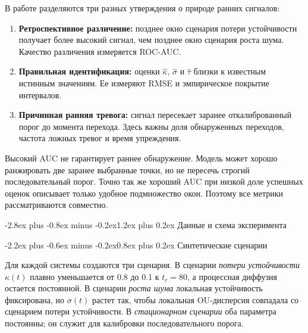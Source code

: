 \documentclass[12pt,a4paper]{article}
\makeatletter
\numberwithin{table}{section}
\numberwithin{figure}{section}
\renewcommand\section{\@startsection{section}{1}{0pt}
  {-2.8ex plus -0.8ex minus -0.2ex}{1.2ex plus 0.2ex}
  {\centering\normalfont\normalsize\bfseries}}
\renewcommand\subsection{\@startsection{subsection}{2}{0pt}
  {-2.2ex plus -0.6ex minus -0.2ex}{0.8ex plus 0.2ex}
  {\normalfont\normalsize\bfseries}}
\newcommand{\term}[1]{\textit{#1}}
\makeatother
\begin{document}
В работе разделяются три разных утверждения о природе ранних сигналов:

\begin{enumerate}
\item \textbf{Ретроспективное различение:} позднее окно сценария потери
устойчивости получает более высокий сигнал, чем позднее окно сценария роста
шума. Качество различения измеряется ROC-AUC.
\item \textbf{Правильная идентификация:} оценки $\widehat\kappa$,
$\widehat\sigma$ и $\widehat\tau$ близки к известным истинным значениям. Ее
измеряют RMSE и эмпирическое покрытие интервалов.
\item \textbf{Причинная ранняя тревога:} сигнал пересекает заранее
откалиброванный порог до момента перехода. Здесь важны доля обнаруженных
переходов, частота ложных тревог и время упреждения.
\end{enumerate}

Высокий AUC не гарантирует раннее обнаружение. Модель может хорошо ранжировать
две заранее выбранные точки, но не пересечь строгий последовательный порог.
Точно так же хороший AUC при низкой доле успешных оценок описывает только
удобное подмножество окон. Поэтому все метрики рассматриваются совместно.

\clearpage
\section{Данные и схема эксперимента}

\subsection{Синтетические сценарии}

Для каждой системы создаются три сценария. В сценарии \term{потери устойчивости}
$\kappa(t)$ плавно уменьшается от 0.8 до 0.1 к $t_c=80$, а процессная диффузия
остается постоянной. В сценарии \term{роста шума} локальная устойчивость
фиксирована, но $\sigma(t)$ растет так, чтобы локальная OU-дисперсия совпадала
со сценарием потери устойчивости. В \term{стационарном сценарии} оба параметра
постоянны; он служит для калибровки последовательного порога.
\end{document}
